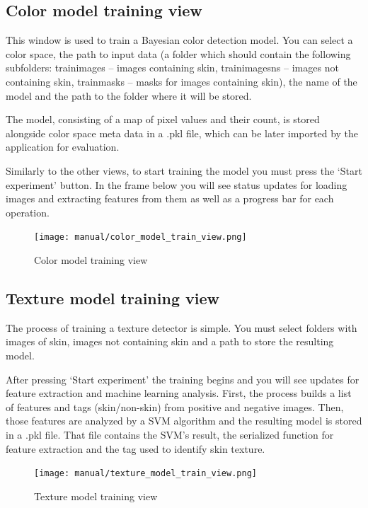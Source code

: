 \documentclass[12pt]{report}
\begin{document}
	\subsection{Color model training view}
	This window is used to train a Bayesian color detection model. You can select a color space, the path to input data (a folder which should contain the following subfolders: train\textunderscore images – images containing skin, train\textunderscore images\textunderscore ns – images not containing skin, train\textunderscore masks – masks for images containing skin), the name of the model and the path to the folder where it will be stored. 
	
	The model, consisting of a map of pixel values and their count, is stored alongside color space meta data in a .pkl file, which can be later imported by the application for evaluation.
	
	Similarly to the other views, to start training the model you must press the ‘Start experiment’ button. In the frame below you will see status updates for loading images and extracting features from them as well as a progress bar for each operation.
	
	\begin{figure}[h!]
		\centering
		\texttt{[image: manual/color\_model\_train\_view.png]}
		\caption{Color model training view}
	\end{figure}
	
	\subsection{Texture model training view}
	The process of training a texture detector is simple. You must select folders with images of skin, images not containing skin and a path to store the resulting model.
	
	After pressing ‘Start experiment’ the training begins and you will see updates for feature extraction and machine learning analysis. First, the process builds a list of features and tags (skin/non-skin) from positive and negative images. Then, those features are analyzed by a SVM algorithm and the resulting model is stored in a .pkl file. That file contains the SVM's result, the serialized function for feature extraction and the tag used to identify skin texture.
	
	\begin{figure}[h!]
		\centering
		\texttt{[image: manual/texture\_model\_train\_view.png]}
		\caption{Texture model training view}
	\end{figure}
	
\end{document}

